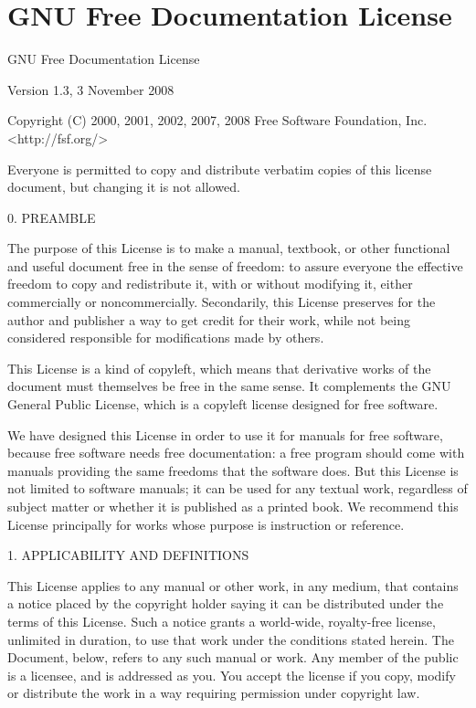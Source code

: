 \chapter{\label{cha:GFDL}GNU Free Documentation License}

GNU Free Documentation License

Version 1.3, 3 November 2008

Copyright (C) 2000, 2001, 2002, 2007, 2008 Free Software Foundation,
Inc. <http://fsf.org/> 

Everyone is permitted to copy and distribute verbatim copies of this
license document, but changing it is not allowed.

0. PREAMBLE

The purpose of this License is to make a manual, textbook, or other
functional and useful document \textquotedbl{}free\textquotedbl{}
in the sense of freedom: to assure everyone the effective freedom
to copy and redistribute it, with or without modifying it, either
commercially or noncommercially. Secondarily, this License preserves
for the author and publisher a way to get credit for their work, while
not being considered responsible for modifications made by others.

This License is a kind of \textquotedbl{}copyleft\textquotedbl{},
which means that derivative works of the document must themselves
be free in the same sense. It complements the GNU General Public License,
which is a copyleft license designed for free software.

We have designed this License in order to use it for manuals for free
software, because free software needs free documentation: a free program
should come with manuals providing the same freedoms that the software
does. But this License is not limited to software manuals; it can
be used for any textual work, regardless of subject matter or whether
it is published as a printed book. We recommend this License principally
for works whose purpose is instruction or reference.

1. APPLICABILITY AND DEFINITIONS

This License applies to any manual or other work, in any medium, that
contains a notice placed by the copyright holder saying it can be
distributed under the terms of this License. Such a notice grants
a world-wide, royalty-free license, unlimited in duration, to use
that work under the conditions stated herein. The \textquotedbl{}Document\textquotedbl{},
below, refers to any such manual or work. Any member of the public
is a licensee, and is addressed as \textquotedbl{}you\textquotedbl{}.
You accept the license if you copy, modify or distribute the work
in a way requiring permission under copyright law.

